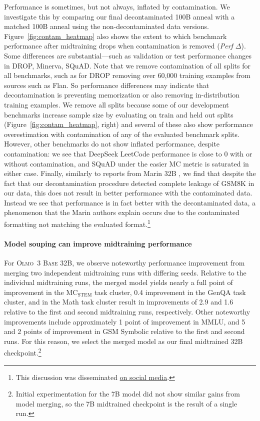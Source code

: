 \documentclass[table]{ai2style/ai2}
\newcommand{\newOlmo}{Olmo\xspace}
\newcommand{\olmothreebase}{\textsc{\newOlmo~3 Base}\xspace}
\begin{document}
Performance is sometimes, but not always, inflated by contamination. We investigate this by comparing our final decontaminated 100B anneal with a matched 100B anneal using the non-decontaminated data versions. Figure~\ref{fig:contam_heatmap} also shows the extent to which benchmark performance after midtraining drops when contamination is removed (\textit{Perf $\Delta$}). Some differences are substantial---such as validation or test performance changes in DROP, Minerva, SQuAD. Note that we remove contamination of all splits for all benchmarks, such as for DROP removing over 60,000 training examples from sources such as Flan. So performance differences may indicate that decontamination is preventing memorization or also removing in-distribution training examples. We remove all splits because some of our development benchmarks increase sample size by evaluating on train and held out splits (Figure~\ref{fig:contam_heatmap}, right) and several of these also show performance overestimation with contamination of any of the evaluated benchmark splits.  However, other benchmarks do not show inflated performance, despite contamination: we see that DeepSeek LeetCode performance is close to 0 with or without contamination, and SQuAD under the easier MC metric is saturated in either case. Finally, similarly to reports from Marin 32B \citep{Hall2025marin}, we find that despite the fact that our decontamination procedure detected complete leakage of GSM8K in our data, this does not result in better performance with the contaminated data. Instead we see that performance is in fact better with the decontaminated data, a phenomenon that the Marin authors explain occurs due to the contaminated formatting not matching the evaluated format.\footnote{This discussion was disseminated \href{https://x.com/percyliang/status/1983561570539176334}{on social media}.}

\paragraph{Model souping can improve midtraining performance}

For \olmothreebase 32B, we observe noteworthy performance improvement from merging two independent midtraining runs with differing seeds. 
Relative to the individual midtraining runs, the merged model yields nearly a full point of improvement in the $\text{MC}_\text{STEM}$ task cluster, 0.4 improvement in the GenQA task cluster, and in the Math task cluster result in improvements of 2.9 and 1.6 relative to the first and second midtraining runs, respectively. 
Other noteworthy improvements include approximately 1 point of improvement in MMLU,
and 5 and 2 points of improvement in GSM Symbolic relative to the first and second runs.
For this reason, we select the merged model as our final midtrained 32B checkpoint.\footnote{Initial experimentation for the 7B model did not show similar gains from model merging, so the 7B midtrained checkpoint is the result of a single run.}
\end{document}
